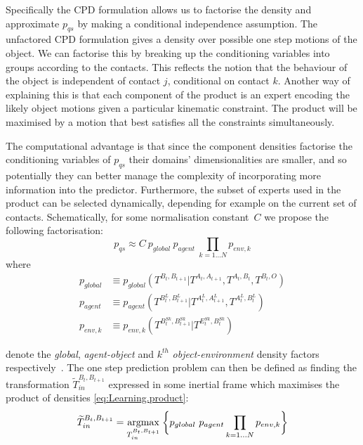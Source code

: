 Specifically the CPD formulation allows us to factorise the density
and approximate $p_{qs}$ by making a conditional independence
assumption. The unfactored CPD formulation gives a density over
possible one step motions of the object. We can
factorise this by breaking up the conditioning variables into groups
according to the contacts. This reflects the notion that the behaviour
of the object is independent of contact $j$, conditional on contact
$k$. Another way of explaining this is that each component of the
product is an expert encoding the likely object motions given a
particular kinematic constraint. The product will be maximised by a
motion that best satisfies all the constraints simultaneously.

The computational advantage is that since the component
densities factorise the conditioning variables of $p_{qs}$ their
domains' dimensionalities are smaller, and so potentially they can
better manage the complexity of incorporating more information into
the predictor.  Furthermore, the subset of experts used in the product can be selected dynamically, depending for example on the current set of contacts. Schematically, for some normalisation constant~$C$ we propose the following factorisation:
\begin{equation}
p_{qs} \approx C\ p_{global}\ p_{agent}\ \mathop{\prod}_{k=1 \ldots N}{ p_{env,k}}
\label{eq:Learning.product}
\end{equation}
\noindent where
\begin{subequations}
\begin{align}
p_{global} &\equiv p_{global}(T^{B_{t}, B_{t+1}}|T^{A_{t}, A_{t+1}}, T^{A_t, B_t}, T^{B_t, O})
\label{eq:Learning.densityglobal} \\
p_{agent} &\equiv p_{agent}(T^{B^{L}_{t}, B^{L}_{t+1}}|T^{A^{L}_{t}, A^{L}_{t+1}}, T^{A^{L}_t, B^{L}_t})
\label{eq:Learning.densitylocal} \\
p_{env,k} &\equiv p_{env,k}(T^{B^{Sk}_t, B^{Sk}_{t+1}} | T^{E^{Sk}_t,B^{Sk}_t})
\label{eq:Learning.densityenv}
\end{align}
\end{subequations}

\noindent denote the \textit{global}, \textit{agent-object} and
$k^{th}$ \textit{object-environment} density factors
respectively~\cite{kopicki_prediction_2009}\cite{kopicki_prediction_2010}. 
The one step prediction problem can then be defined as finding the
transformation $\widetilde{T}_{in}^{B_{t}, B_{t+1}}$ expressed in some inertial frame which maximises the product of densities \eqref{eq:Learning.product}:
\begin{equation}
\widetilde{T}_{in}^{B_{t}, B_{t+1}} = \argmax{T_{in}^{B_{t}, B_{t+1}}} \bigg\lbrace
p_{global}\  p_{agent} \mathop{\prod}_{k=1 \ldots N}{ p_{env,k} }
\bigg\rbrace
\label{eq:Learning.MultiFactorProduct}
\end{equation}


